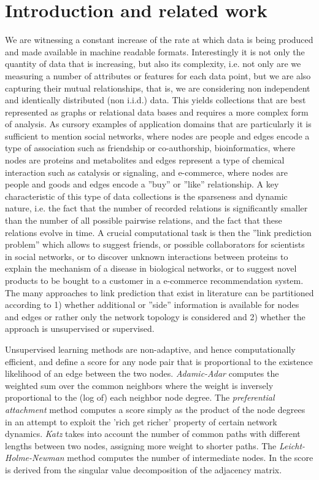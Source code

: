 \documentclass[runningheads,a4paper]{llncs}
\begin{document}
\section{Introduction and related work}
We are witnessing a constant increase of the rate at which data is being produced and made available in machine readable formats. Interestingly it is not only the quantity of data that is increasing, but also its complexity, i.e. not only are we measuring a number of attributes or features for each data point, but we are also capturing their mutual relationships, that is, we are considering non independent and identically distributed (non i.i.d.) data. This yields collections that are best represented as graphs or relational data bases and requires a more complex form of analysis. As cursory examples of application domains that are particularly  it is sufficient to mention social networks, where nodes are people and edges encode a type of association such as friendship or co-authorship, bioinformatics, where nodes are proteins and metabolites and edges represent a type of chemical interaction such as catalysis or signaling, and e-commerce, where nodes are people and goods and edges encode a ''buy'' or ''like'' relationship.
A key characteristic of this type of data collections is the sparseness and dynamic nature, i.e. the fact that the number of recorded relations is significantly smaller than the number of all possible pairwise relations, and the fact that these relations evolve in time. A crucial computational task is then the ''link prediction problem'' which allows to suggest friends, or possible collaborators for scientists in social networks, or to discover unknown interactions between proteins to explain the mechanism of a disease in biological networks, or to suggest novel products to be bought to a customer in a e-commerce recommendation system. The many approaches to link prediction that exist in literature can be partitioned according to 1) whether additional or ''side'' information is available for nodes and edges or rather only the network topology is considered and 2) whether the approach is unsupervised or supervised. 

Unsupervised learning methods are non-adaptive, and hence computationally efficient, and define a score for any node pair that is proportional to the existence likelihood of an edge between the two nodes. \textit{Adamic-Adar} \cite{adamic} computes the weighted sum over the common neighbors where the weight is inversely proportional to the (log of) each neighbor node degree. The \textit{preferential attachment} method computes a score simply as the product of the node degrees in an attempt to exploit the 'rich get richer' property of certain network dynamics. \textit{Katz} \cite{katz} takes into account the number of common paths with different lengths between two nodes, assigning more weight to shorter paths. The \textit{Leicht-Holme-Newman} method \cite{lhni} computes the number of intermediate nodes. In \cite{matrix-factorization} the score is derived from the singular value decomposition of the adjacency matrix. 
\end{document}
